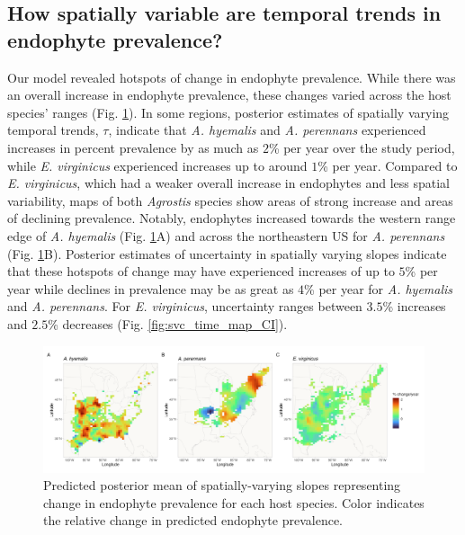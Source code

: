 \documentclass[11pt]{article}
\begin{document}
\subsection*{How spatially variable are temporal trends in endophyte prevalence?}
Our model revealed hotspots of change in endophyte prevalence. 
While there was an overall increase in endophyte prevalence, these changes varied across the host species' ranges (Fig. \ref{fig:svc_time_map}).
In some regions, posterior estimates of spatially varying temporal trends, $\tau$, indicate that \emph{A. hyemalis} and \emph{A. perennans} experienced increases in percent prevalence by as much as $2$\% per year over the study period, while  \emph{E. virginicus} experienced increases up to around $1$\% per year. 
Compared to \emph{E. virginicus}, which had a weaker overall increase in endophytes and less spatial variability, maps of both \emph{Agrostis} species show areas of strong increase and areas of declining prevalence.
Notably, endophytes increased towards the western range edge of \emph{A. hyemalis} (Fig. \ref{fig:svc_time_map}A) and across the northeastern US for \emph{A. perennans} (Fig. \ref{fig:svc_time_map}B). 
Posterior estimates of uncertainty in spatially varying slopes indicate that these hotspots of change may have experienced increases of up to $5$\% per year while declines in prevalence may be as great as $4$\% per year for \emph{A. hyemalis} and \emph{A. perennans}.
For \emph{E. virginicus}, uncertainty ranges between $3.5$\% increases and $2.5$\% decreases (Fig. \ref{fig:svc_time_map_CI}).

\begin{figure}[H]
	\centering
	\includegraphics[width = \linewidth]{../Plots/svc_time_map.png}
	\caption[Predicted posterior mean of spatially-varying slopes representing change in endophyte prevalence for each host species.]{Predicted posterior mean of spatially-varying slopes representing change in endophyte prevalence for each host species. Color indicates the relative change in predicted endophyte prevalence.}
	\label{fig:svc_time_map}
\end{figure}
\end{document}
